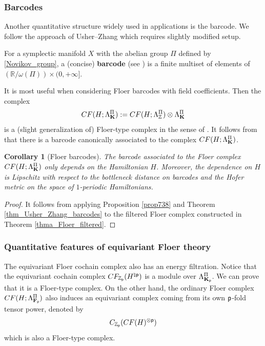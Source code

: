 \documentclass[reqno, 10pt]{amsart}
\numberwithin{equation}{section}
\numberwithin{equation}{section}
\newtheorem{cor}[thm]{Corollary}
\theoremstyle{definition}
\theoremstyle{remark}
\newcommand{\beqn}{\begin{equation*}}
\newcommand{\eeqn}{\end{equation*}}
\newcommand{\mb}{\mathbb}
\newcommand{\p}{{\sf p}}
\newcommand{\fp}{{\bf F}_{\sf p}}
\newcommand{\kp}{{\bf K}_{\sf p}}
\newcommand{\zp}{{{\mb Z}_{\sf p}}}
\begin{document}
\subsubsection{Barcodes}

Another quantitative structure widely used in applications is the barcode. We follow the approach of Usher--Zhang \cite{Usher_Zhang_2016} which requires slightly modified setup. 

For a symplectic manifold $X$ with the abelian group $\Pi$ defined by \eqref{Novikov_group}, a (concise) {\bf barcode} (see \cite{Usher_Zhang_2016}) is a finite multiset of elements of $({\mb R}/\omega(\Pi)) \times (0, +\infty]$. 

It is most useful when considering Floer barcodes with field coefficients. Then the complex
\beqn
CF (H; \Lambda_{\bf K}^{\Pi}):= CF(H; \Lambda_{\mb Z}^\Pi) \otimes \Lambda_{\bf K}^{\Pi}
\eeqn
is a (slight generalization of) Floer-type complex in the sense of \cite[Definition 4.1]{Usher_Zhang_2016}. It follows from \cite[Definition 6.3, Theorem 7.1]{Usher_Zhang_2016} that there is a barcode canonically associated to the complex $CF(H; \Lambda_{\bf K}^{\Pi})$. 

\begin{cor}[Floer barcodes] The barcode associated to the Floer complex $CF(H; \Lambda_{{\bf K}}^{\Pi})$ only depends on the Hamiltonian $H$. Moreover, the dependence on $H$ is Lipschitz with respect to the bottleneck distance on barcodes and the Hofer metric on the space of $1$-periodic Hamiltonians.
\end{cor}
\begin{proof}
    It follows from applying Proposition \ref{prop738} and Theorem \ref{thm_Usher_Zhang_barcodes} to the filtered Floer complex constructed in Theorem \ref{thma_Floer_filtered}.
\end{proof}



\subsubsection{Quantitative features of equivariant Floer theory}

The equivariant Floer cochain complex also has an energy filtration. Notice that the equivariant cochain complex $CF_{\zp} (H^{\natural \p})$ is a module over $\Lambda_{\kp}^\Pi$. We can prove that it is a Floer-type complex. On the other hand, the ordinary Floer complex $CF(H; \Lambda_{\fp}^\Pi)$ also induces an equivariant complex coming from its own $\p$-fold tensor power, denoted by 
\beqn
C_{\zp}(CF(H)^{\otimes \p})
\eeqn
which is also a Floer-type complex. 
\end{document}
